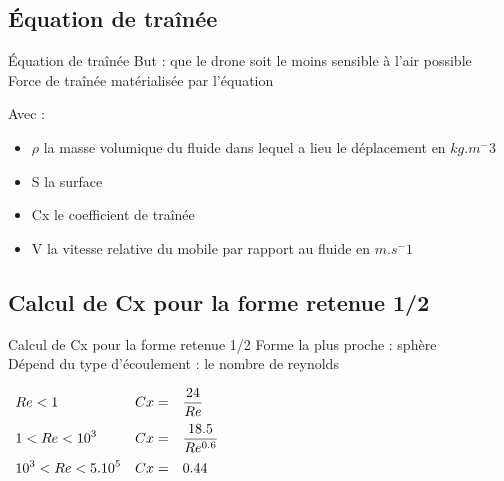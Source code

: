 \documentclass{beamer}
\begin{document}
\subsection{Équation de traînée}
\begin{frame}{Équation de traînée}
 But : que le drone soit le moins sensible à l'air possible \\
 Force de traînée matérialisée par l'équation \\
 \begin{center}
 \end{center}
 Avec : \\
 \begin{itemize}
  \item $\rho$ la masse volumique du fluide dans lequel a lieu le déplacement en $kg.m^-3$ \\
  \item S la surface \\
  \item Cx le coefficient de traînée \\
  \item V la vitesse relative du mobile par rapport au fluide en $m.s^-1$
 \end{itemize} 
\end{frame}

\subsection{Calcul de Cx pour la forme retenue 1/2}
\begin{frame}{Calcul de Cx pour la forme retenue 1/2}
 Forme la plus proche : sphère \\
 Dépend du type d'écoulement : le nombre de reynolds \\
 \begin{center}
  $\begin{array}{>{\displaystyle}l>{\displaystyle}l>{\displaystyle}l}
   Re < 1 & Cx = & \frac{24}{Re} \medbreak \\
   1 < Re < 10^3 & Cx = & \frac{18.5}{Re^{0.6}} \medbreak \\
   10^3 < Re < 5.10^5 & Cx = & 0.44
  \end{array}$
 \end{center}
\end{frame}
\end{document}
